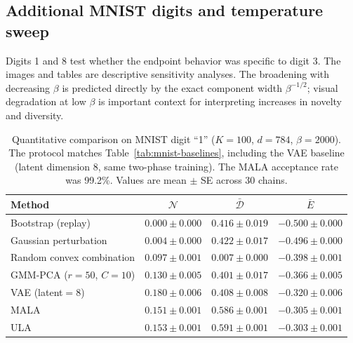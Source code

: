 \subsection{Additional MNIST digits and temperature sweep}
Digits 1 and 8 test whether the endpoint behavior was specific to digit 3. The
images and tables are descriptive sensitivity analyses.
The broadening with decreasing $\beta$ is predicted directly by the exact
component width $\beta^{-1/2}$; visual degradation at low $\beta$ is important
context for interpreting increases in novelty and diversity.
\begin{table}[ht]
\centering
\caption{Quantitative comparison on MNIST digit ``1'' ($K{=}100$, $d{=}784$, $\beta{=}2000$). The protocol matches Table~\ref{tab:mnist-baselines}, including the VAE baseline (latent dimension 8, same two-phase training). The MALA acceptance rate was 99.2\%. Values are mean $\pm$ SE across 30 chains.}
\label{tab:mnist-digit1}
\small
\begin{tabular}{@{}lccc@{}}
\toprule
Method & $\mathcal{N}$ & $\bar{\mathcal{D}}$ & $\bar{E}$ \\
\midrule
Bootstrap (replay)          & $0.000 \pm 0.000$ & $0.416 \pm 0.019$ & $-0.500 \pm 0.000$ \\
Gaussian perturbation       & $0.004 \pm 0.000$ & $0.422 \pm 0.017$ & $-0.496 \pm 0.000$ \\
Random convex combination   & $0.097 \pm 0.001$ & $0.007 \pm 0.000$ & $-0.398 \pm 0.001$ \\
GMM-PCA ($r{=}50$, $C{=}10$) & $0.130 \pm 0.005$ & $0.401 \pm 0.017$ & $-0.366 \pm 0.005$ \\
VAE (latent${=}8$)          & $0.180 \pm 0.006$ & $0.408 \pm 0.008$ & $-0.320 \pm 0.006$ \\
MALA                        & $0.151 \pm 0.001$ & $0.586 \pm 0.001$ & $-0.305 \pm 0.001$ \\
ULA & $0.153 \pm 0.001$ & $0.591 \pm 0.001$ & $-0.303 \pm 0.001$ \\
\bottomrule
\end{tabular}
\end{table}

